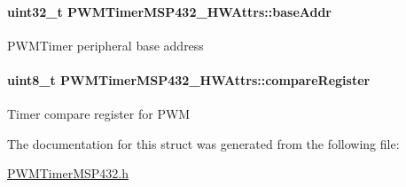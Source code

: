 \paragraph[{base\+Addr}]{\setlength{\rightskip}{0pt plus 5cm}uint32\+\_\+t P\+W\+M\+Timer\+M\+S\+P432\+\_\+\+H\+W\+Attrs\+::base\+Addr}\label{struct_p_w_m_timer_m_s_p432___h_w_attrs_a38a00f25e209ee1f208fcba5b1798260}
P\+W\+M\+Timer peripheral base address 
\paragraph[{compare\+Register}]{\setlength{\rightskip}{0pt plus 5cm}uint8\+\_\+t P\+W\+M\+Timer\+M\+S\+P432\+\_\+\+H\+W\+Attrs\+::compare\+Register}\label{struct_p_w_m_timer_m_s_p432___h_w_attrs_a2e726667a080f99fa9313402f949e3b8}
Timer compare register for P\+W\+M 

The documentation for this struct was generated from the following file\+:\begin{DoxyCompactItemize}
\item 
\hyperlink{_p_w_m_timer_m_s_p432_8h}{P\+W\+M\+Timer\+M\+S\+P432.\+h}\end{DoxyCompactItemize}
